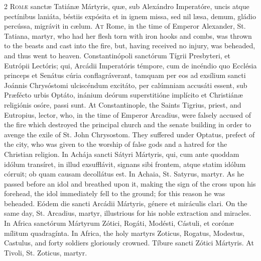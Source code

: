 \begin{paracol}{2}
\lettrine[lines=2]{R}{omæ} sanctæ Tatiánæ Mártyris, quæ, sub 
 Alexándro Imperatóre, uncis atque pectínibus laniáta, béstiis expósita et in 
 ignem missa, sed nil læsa, demum, gládio percússa, migrávit in cælum.
\switchcolumn
{}
\lettrine[lines=2]{A}{t} Rome, in the time of Emperor Alexander, St. Tatiana, martyr, who had her 
 flesh torn with iron hooks and combs, was thrown to the beasts and cast into 
 the fire, but, having received no injury, was beheaded, and thus went to 
 heaven.
\switchcolumn*
{}
Constantinópoli sanctórum Tígrii Presbyteri, et Eutrópii Lectóris; qui, 
 Arcádii Imperatóris témpore, cum de incéndio quo Ecclésia princeps et 
 Senátus cúria conflagráverant, tamquam 
 per eos ad exsílium sancti Joánnis Chrysóstomi ulciscéndum excitáto, per 
 calúmniam accusáti essent, sub Præfécto urbis 
 Optáto, inánium deórum superstitióne implícito et Christiánæ religiónis 
 osóre, passi sunt.
\switchcolumn
{}
At Constantinople, the Saints Tigrius, priest, and Eutropius, lector, who, 
 in the time of Emperor Arcadius, were falsely accused of the fire which 
 destroyed the principal church and the senate building in order to avenge 
 the exile of St. John Chrysostom. They suffered under Optatus, prefect 
 of the city, who was given to the worship of false gods and a hatred for the 
 Christian religion.
\switchcolumn*
{}
In Achája sancti Sátyri Mártyris, qui, cum ante 
 quoddam idólum transíret, in illud exsufflávit, signans sibi frontem, atque 
 statim idólum córruit; ob quam causam decollátus est.
\switchcolumn
{}
In Achaia, St. Satyrus, martyr. As he passed before an idol and 
 breathed upon it, making the sign of the cross upon his forehead, the idol 
 immediately fell to the ground; for this reason he was beheaded.
\switchcolumn*
{}
Eódem die sancti Arcádii Mártyris, génere et miráculis clari.
\switchcolumn
{}
On the same day, St. Arcadius, martyr, illustrious for his noble extraction 
 and miracles.
\switchcolumn*
{}
In Africa sanctórum Mártyrum Zótici, Rogáti, 
 Modésti, Cástuli, et corónæ mílitum quadragínta.
\switchcolumn
{}
In Africa, the holy martyrs Zoticus, Rogatus, Modestus, Castulus, and forty 
 soldiers gloriously crowned.
\switchcolumn*
{}
Tíbure sancti Zótici Mártyris.
\switchcolumn
{}
At Tivoli, St. Zoticus, martyr.
\switchcolumn*

\end{paracol}
